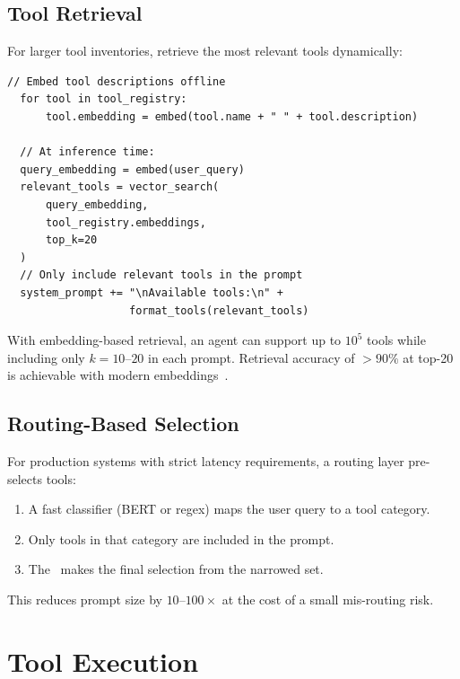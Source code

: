 \subsection{Tool Retrieval}

For larger tool inventories, retrieve the most relevant tools dynamically:

\begin{lstlisting}[caption=Tool retrieval flow]
  // Embed tool descriptions offline
  for tool in tool_registry:
      tool.embedding = embed(tool.name + " " + tool.description)

  // At inference time:
  query_embedding = embed(user_query)
  relevant_tools = vector_search(
      query_embedding,
      tool_registry.embeddings,
      top_k=20
  )
  // Only include relevant tools in the prompt
  system_prompt += "\nAvailable tools:\n" +
                   format_tools(relevant_tools)
\end{lstlisting}

\begin{theorem}
	With embedding-based retrieval, an agent can support up to $10^5$ tools while including only $k = 10$--$20$ in each prompt. Retrieval accuracy of $>90\%$ at top-20 is achievable with modern embeddings~\cite{qin2023toolllm}.
\end{theorem}

\subsection{Routing-Based Selection}

For production systems with strict latency requirements, a routing layer pre-selects tools:

\begin{enumerate}
	\item A fast classifier (BERT or regex) maps the user query to a tool category.
	\item Only tools in that category are included in the prompt.
	\item The \llm\ makes the final selection from the narrowed set.
\end{enumerate}

This reduces prompt size by $10$--$100\times$ at the cost of a small mis-routing risk.

\section{Tool Execution}

